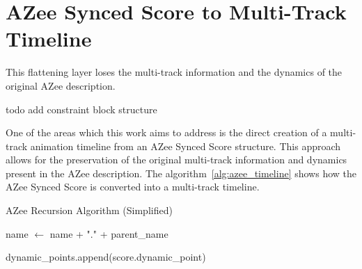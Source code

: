 \documentclass[../../main.tex]{subfiles}
\begin{document}
\section{AZee Synced Score to Multi-Track Timeline}
\label{ch:multi_track:score_to_timeline}

This flattening layer loses the multi-track information and the dynamics of the original AZee description. 

todo add constraint block structure

One of the areas which this work aims to address is the direct creation of a multi-track animation timeline from an AZee Synced Score structure. This approach allows for the preservation of the original multi-track information and dynamics present in the AZee description. The algorithm~\ref{alg:azee_timeline} shows how the AZee Synced Score is converted into a multi-track timeline.

\begin{algorithm}
    \caption{AZee Recursion Algorithm (Simplified)}
    \label{alg:azee_timeline}
    \begin{algorithmic}[1]
                \State name $\gets$ name + "." + parent\_name
                \State {}
            \EndIf
            
            \State {}
                \State dynamic\_points.append(score.dynamic\_point)
            \EndIf
            
                \State \Return {}
                    \State {}
                \EndFor
            \Else
                \State \Return {}
            \EndIf
            
                \State {}
            \EndIf
        \EndFunction
    \end{algorithmic}
\end{algorithm}
\end{document}
